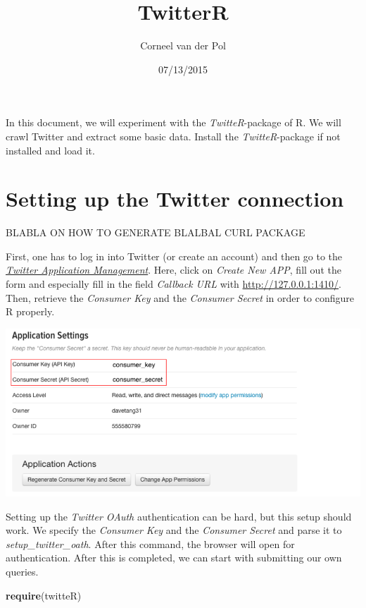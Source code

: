 \documentclass[]{article}
\title{TwitterR}
\author{Corneel van der Pol}
\date{07/13/2015}
\newenvironment{Shaded}{\begin{snugshade}}{\end{snugshade}}
\newcommand{\KeywordTok}[1]{\textcolor[rgb]{0.13,0.29,0.53}{\textbf{{#1}}}}
\newcommand{\NormalTok}[1]{{#1}}
\begin{document}
\maketitle


In this document, we will experiment with the \emph{TwitteR}-package of
R. We will crawl Twitter and extract some basic data. Install the
\emph{TwitteR}-package if not installed and load it.

\section{Setting up the Twitter
connection}\label{setting-up-the-twitter-connection}

BLABLA ON HOW TO GENERATE BLALBAL CURL PACKAGE

First, one has to log in into Twitter (or create an account) and then go
to the \href{https://aps.twitter.com}{\emph{Twitter Application
Management}}. Here, click on \emph{Create New APP}, fill out the form
and especially fill in the field \emph{Callback URL} with
\url{http://127.0.0.1:1410/}. Then, retrieve the \emph{Consumer Key} and
the \emph{Consumer Secret} in order to configure R properly.

\includegraphics{figures/twitter_app.png}

Setting up the \emph{Twitter OAuth} authentication can be hard, but this
setup should work. We specify the \emph{Consumer Key} and the
\emph{Consumer Secret} and parse it to \emph{setup\_twitter\_oath}.
After this command, the browser will open for authentication. After this
is completed, we can start with submitting our own queries.

\begin{Shaded}
\begin{Highlighting}[]
\KeywordTok{require}\NormalTok{(twitteR)}
\end{Highlighting}
\end{Shaded}
\end{document}
